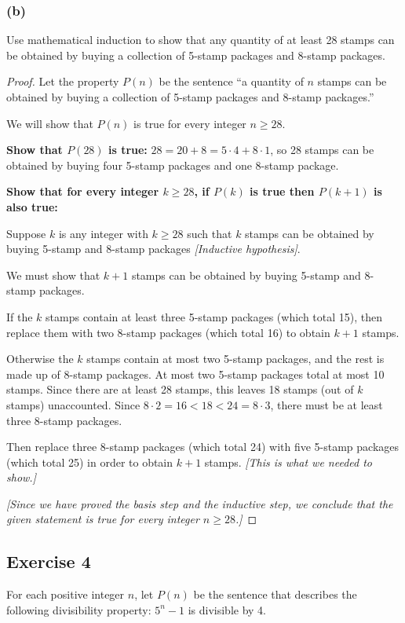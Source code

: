 \documentclass[14pt]{extarticle}
\begin{document}
\subsubsection{(b)}
Use mathematical induction to show that any quantity of at least 28 stamps can be obtained by buying a collection of 5-stamp packages and 8-stamp packages.

\begin{proof}
    Let the property $P(n)$ be the sentence “a quantity of $n$ stamps can be obtained by buying a collection of 5-stamp packages and 8-stamp packages.”

    We will show that $P(n)$ is true for every integer $n \geq 28$.

        {\bf Show that $P(28)$ is true:} $28 = 20 + 8 = 5 \cdot 4 + 8 \cdot 1$, so 28 stamps can be obtained by buying four 5-stamp packages and one 8-stamp package.

        {\bf Show that for every integer $k \geq 28$, if $P(k)$ is true then $P(k + 1)$ is also true:}

    Suppose $k$ is any integer with $k \geq 28$ such that $k$ stamps can be obtained by buying 5-stamp and 8-stamp packages {\it [Inductive hypothesis]}.

    We must show that $k + 1$ stamps can be obtained by buying 5-stamp and 8-stamp packages.

    If the $k$ stamps contain at least three 5-stamp packages (which total 15), then replace them with two 8-stamp packages (which total 16) to obtain $k+1$ stamps.

    Otherwise the $k$ stamps contain at most two 5-stamp packages, and the rest is made up of 8-stamp packages. At most two 5-stamp packages total at most 10 stamps. Since there are at least 28 stamps, this leaves 18 stamps (out of $k$ stamps) unaccounted. Since $8 \cdot 2  = 16 < 18 < 24 = 8 \cdot 3$, there must be at least three 8-stamp packages.

    Then replace three 8-stamp packages (which total 24) with five 5-stamp packages (which total 25) in order to obtain $k+1$ stamps. {\it [This is what we needed to show.]}

        {\it [Since we have proved the basis step and the inductive step, we conclude that the given statement is true for every integer $n \geq 28$.]}
\end{proof}

\subsection{Exercise 4}
For each positive integer $n$, let $P(n)$ be the sentence that describes the following divisibility property: $5^n - 1$ is divisible by 4.
\end{document}
